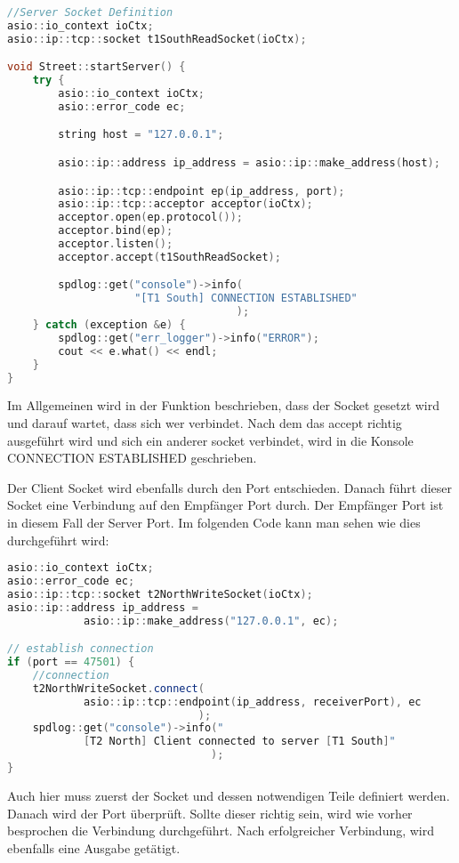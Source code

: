 \documentclass[12pt, oneside]{article}
\begin{document}
\begin{lstlisting}[language=C++, caption={C++ street.cpp - Server Verbindung}]
//Server Socket Definition
asio::io_context ioCtx;
asio::ip::tcp::socket t1SouthReadSocket(ioCtx);

void Street::startServer() {
    try {
        asio::io_context ioCtx;
        asio::error_code ec;

        string host = "127.0.0.1";

        asio::ip::address ip_address = asio::ip::make_address(host);

        asio::ip::tcp::endpoint ep(ip_address, port);
        asio::ip::tcp::acceptor acceptor(ioCtx);
        acceptor.open(ep.protocol());
        acceptor.bind(ep);
        acceptor.listen();
        acceptor.accept(t1SouthReadSocket);

        spdlog::get("console")->info(
                    "[T1 South] CONNECTION ESTABLISHED"
                                    );
    } catch (exception &e) {
        spdlog::get("err_logger")->info("ERROR");
        cout << e.what() << endl;
    }
}
\end{lstlisting}
Im Allgemeinen wird in der Funktion beschrieben, dass der Socket gesetzt wird und darauf wartet, dass sich wer verbindet. Nach dem das accept richtig ausgeführt wird und sich ein anderer socket verbindet, wird in die Konsole CONNECTION ESTABLISHED geschrieben. \vspace{1em}

\noindent Der Client Socket wird ebenfalls durch den Port entschieden. Danach führt dieser Socket eine Verbindung auf den Empfänger Port durch. Der Empfänger Port ist in diesem Fall der Server Port. Im folgenden Code kann man sehen wie dies durchgeführt wird:

\begin{lstlisting}[language=C++, caption={C++ street.cpp - Client Verbindung}]
asio::io_context ioCtx;
asio::error_code ec;
asio::ip::tcp::socket t2NorthWriteSocket(ioCtx);
asio::ip::address ip_address = 
            asio::ip::make_address("127.0.0.1", ec);

// establish connection
if (port == 47501) {
    //connection
    t2NorthWriteSocket.connect(
            asio::ip::tcp::endpoint(ip_address, receiverPort), ec
                              );
    spdlog::get("console")->info("
            [T2 North] Client connected to server [T1 South]"
                                );
}
\end{lstlisting}
Auch hier muss zuerst der Socket und dessen notwendigen Teile definiert werden. Danach wird der Port überprüft. Sollte dieser richtig sein, wird wie vorher besprochen die Verbindung durchgeführt. Nach erfolgreicher Verbindung, wird ebenfalls eine Ausgabe getätigt.
\end{document}
